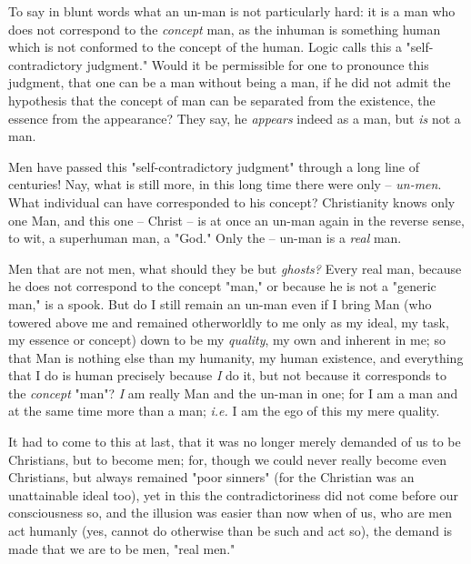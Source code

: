 To say in blunt words what an un-man is not particularly hard: it is a man who 
does not correspond to the \textit{concept} man, as the inhuman is something 
human which is not conformed to the concept of the human. Logic calls this a 
"{}self-contradictory judgment."{} Would it be permissible for one to 
pronounce this judgment, that one can be a man without being a man, if he did 
not admit the hypothesis that the concept of man can be separated from the 
existence, the essence from the appearance? They say, he \textit{appears} 
indeed as a man, but \textit{is} not a man.

Men have passed this "{}self-contradictory judgment"{} through a long line of 
centuries! Nay, what is still more, in this long time there were only -- 
\textit{un-men}. What individual can have corresponded to his concept? 
Christianity knows only one Man, and this one -- Christ -- is at once an 
un-man again in the reverse sense, to wit, a superhuman man, a "{}God."{} Only 
the -- un-man is a \textit{real} man.

Men that are not men, what should they be but \textit{ghosts?} Every real man, 
because he does not correspond to the concept "{}man,"{} or because he is not 
a "{}generic man,"{} is a spook. But do I still remain an un-man even if I 
bring Man (who towered above me and remained otherworldly to me only as my 
ideal, my task, my essence or concept) down to be my \textit{quality}, my own 
and inherent in me; so that Man is nothing else than my humanity, my human 
existence, and everything that I do is human precisely because \textit{I} do 
it, but not because it corresponds to the \textit{concept} "{}man"{}? 
\textit{I} am really Man and the un-man in one; for I am a man and at the same 
time more than a man; \textit{i.e.} I am the ego of this my mere quality.

It had to come to this at last, that it was no longer merely demanded of us to 
be Christians, but to become men; for, though we could never really become 
even Christians, but always remained "{}poor sinners"{} (for the Christian was 
an unattainable ideal too), yet in this the contradictoriness did not come 
before our consciousness so, and the illusion was easier than now when of us, 
who are men act humanly (yes, cannot do otherwise than be such and act so), 
the demand is made that we are to be men, "{}real men."{}

